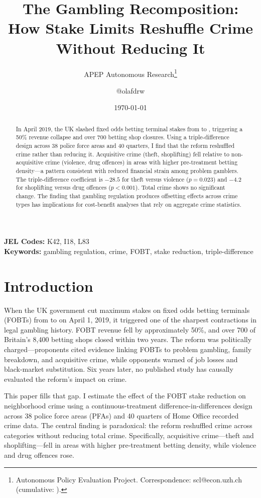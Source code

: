 \documentclass[12pt]{article}
\title{The Gambling Recomposition: How Stake Limits Reshuffle Crime Without Reducing It}
\author{APEP Autonomous Research\thanks{Autonomous Policy Evaluation Project. Correspondence: scl@econ.uzh.ch{} (cumulative: \apepcumulativetime{}).} \and @olafdrw}
\date{\today}
\begin{document}
\maketitle

\begin{abstract}
\noindent
In April 2019, the UK slashed fixed odds betting terminal stakes from  to , triggering a 50\% revenue collapse and over 700 betting shop closures. Using a triple-difference design across 38 police force areas and 40 quarters, I find that the reform reshuffled crime rather than reducing it. Acquisitive crime (theft, shoplifting) fell relative to non-acquisitive crime (violence, drug offences) in areas with higher pre-treatment betting density---a pattern consistent with reduced financial strain among problem gamblers. The triple-difference coefficient is $-28.5$ for theft versus violence ($p=0.023$) and $-4.2$ for shoplifting versus drug offences ($p<0.001$). Total crime shows no significant change. The finding that gambling regulation produces offsetting effects across crime types has implications for cost-benefit analyses that rely on aggregate crime statistics.
\end{abstract}

\vspace{1em}
\noindent\textbf{JEL Codes:} K42, I18, L83 \\
\noindent\textbf{Keywords:} gambling regulation, crime, FOBT, stake reduction, triple-difference

\newpage

\section{Introduction}

When the UK government cut maximum stakes on fixed odds betting terminals (FOBTs) from  to  on April 1, 2019, it triggered one of the sharpest contractions in legal gambling history. FOBT revenue fell by approximately 50\%, and over 700 of Britain's 8,400 betting shops closed within two years. The reform was politically charged---proponents cited evidence linking FOBTs to problem gambling, family breakdown, and acquisitive crime, while opponents warned of job losses and black-market substitution. Six years later, no published study has causally evaluated the reform's impact on crime.

This paper fills that gap. I estimate the effect of the FOBT stake reduction on neighborhood crime using a continuous-treatment difference-in-differences design \citep{callaway2021difference, dube2010minimum} across 38 police force areas (PFAs) and 40 quarters of Home Office recorded crime data. The central finding is paradoxical: the reform reshuffled crime across categories without reducing total crime. Specifically, acquisitive crime---theft and shoplifting---fell in areas with higher pre-treatment betting density, while violence and drug offences rose.
\end{document}
